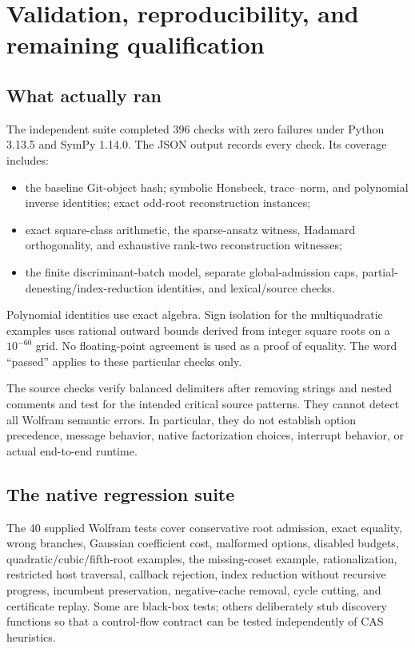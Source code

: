 \documentclass[11pt,a4paper]{article}
\theoremstyle{definition}\newtheorem{definition}[proposition]{Definition}
\theoremstyle{remark}\newtheorem{remark}[proposition]{Remark}
\begin{document}
\section{Validation, reproducibility, and remaining qualification}

\subsection{What actually ran}
The independent suite completed 396 checks with zero failures under Python
3.13.5 and SymPy 1.14.0. The JSON output records every check. Its coverage includes:
\begin{itemize}
\item the baseline Git-object hash; symbolic Honsbeek, trace--norm, and polynomial
inverse identities; exact odd-root reconstruction instances;
\item exact square-class arithmetic, the sparse-ansatz witness, Hadamard
orthogonality, and exhaustive rank-two reconstruction witnesses;
\item the finite discriminant-batch model, separate global-admission caps,
partial-denesting/index-reduction identities, and lexical/source checks.
\end{itemize}
Polynomial identities use exact algebra. Sign isolation for the multiquadratic
examples uses rational outward bounds derived from integer square roots on a
$10^{-60}$ grid. No floating-point agreement is used as a proof of equality.
The word ``passed'' applies to these particular checks only.

The source checks verify balanced delimiters after removing strings and nested
comments and test for the intended critical source patterns. They cannot detect
all Wolfram semantic errors. In particular, they do not establish option
precedence, message behavior, native factorization choices, interrupt behavior,
or actual end-to-end runtime.

\subsection{The native regression suite}
The 40 supplied Wolfram tests cover conservative root admission, exact equality,
wrong branches, Gaussian coefficient cost, malformed options, disabled budgets,
quadratic/cubic/fifth-root examples, the missing-coset example, rationalization,
restricted host traversal, callback rejection, index reduction without recursive
progress, incumbent preservation, negative-cache removal, cycle cutting, and
certificate replay. Some are black-box tests; others deliberately stub discovery
functions so that a control-flow contract can be tested independently of CAS
heuristics.
\end{document}
